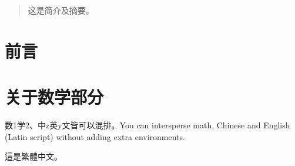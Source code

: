 \documentclass[CJKecglue]{ctexart}
\begin{document}
\tableofcontents

\begin{abstract}
这是简介及摘要。
\end{abstract}

\section{前言}

\section{关于数学部分}

{数1学2}、中z英y文皆可以混排。You can intersperse math, Chinese and English (Latin script) without adding extra environments.

這是繁體中文。
\end{document}
